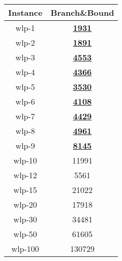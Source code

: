 \documentclass{article}
\newcommand{\sol}[1]{#1}
\newcommand{\proved}[1]{\textbf{\underline{#1}}}
\begin{document}
\begin{table}[H]
    \begin{center}
        \begin{tabular}{|c|c|}
            \hline
            \textbf{Instance}&\textbf{Branch\&Bound}  \\
            \hline
            wlp-1         &   \proved{1931} \\
            \hline
            wlp-2         &   \proved{1891} \\
            \hline
            wlp-3         &   \proved{4553} \\
            \hline
            wlp-4         &   \proved{4366} \\
            \hline
            wlp-5         &   \proved{3530} \\
            \hline
            wlp-6         &   \proved{4108} \\
            \hline
            wlp-7         &   \proved{4429} \\
            \hline
            wlp-8         &   \proved{4961} \\
            \hline
            wlp-9         &   \proved{8145}    \\
            \hline
            wlp-10        &   \sol{11991}   \\
            \hline
            wlp-12        &   \sol{5561}    \\
            \hline
            wlp-15        &   \sol{21022}   \\
            \hline
            wlp-20        &   \sol{17918}   \\
            \hline
            wlp-30        &   \sol{34481}   \\
            \hline
            wlp-50        &   \sol{61605}   \\
            \hline
            wlp-100       &   \sol{130729}  \\
            \hline
        \end{tabular}
    \end{center}
\end{table}
\end{document}
